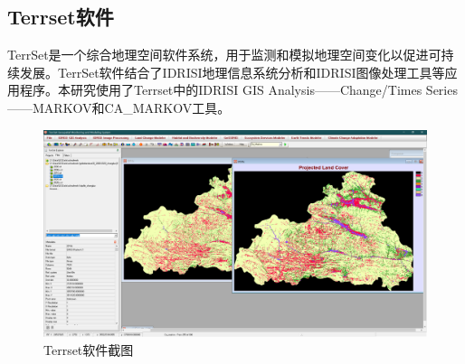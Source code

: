 \documentclass[10pt,aspectratio=169]{beamer} %
\begin{document}
	\subsection{Terrset软件}
\begin{frame}[c]{\secname}{\subsecname}
	TerrSet\cite{TerrSetGeospatialMonitoring}是一个综合地理空间软件系统，用于监测和模拟地理空间变化以促进可持续发展。TerrSet软件结合了IDRISI地理信息系统分析和IDRISI图像处理工具等应用程序。本研究使用了Terrset中的IDRISI GIS Analysis——Change/Times Series——MARKOV和CA\_MARKOV工具。
	\begin{figure}
		\centering
		\includegraphics[height=0.6\textheight]{images/jietu}
		\caption{Terrset软件截图}
		\label{Fig.main.3}
	\end{figure}
	
\end{frame}
\end{document}
